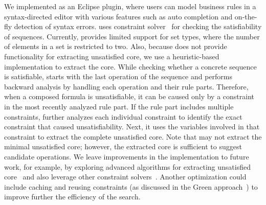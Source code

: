 We implemented \tool{} as an Eclipse plugin, where users can model business
rules in a syntax-directed editor with various features such as auto completion
and on-the-fly detection of syntax errors. \tool{} uses \choco{} constraint
solver~\cite{Choco} for checking the satisfiability of sequences.  Currently,
\tool{} provides limited support for set types, where the number of elements in
a set is restricted to two. Also, because \choco{} does not provide
functionality for extracting unsatisfied core, we use a heuristic-based
implementation to extract the core. While checking whether a concrete sequence
is satisfiable, \tool{} starts with the last operation of the sequence and
performs backward analysis by handling each operation and their rule
parts. Therefore, when a composed formula is unsatisfiable, it can be caused
only by a constraint in the most recently analyzed rule part. If the rule part
includes multiple constraints, \tool{} further analyzes each individual
constraint to identify the exact constraint that caused unsatisfiability. Next,
it uses the variables involved in that constraint to extract the complete
unsatisfied core. Note that \tool{} may not extract the minimal unsatisfied
core; however, the extracted core is sufficient to suggest candidate
operations. We leave improvements in the implementation to future work, for
example, by exploring advanced algorithms for extracting unsatisfied
core~\cite{Liffiton:2008:ACM} and also leverage other constraint
solvers~\cite{DeMoura:2008}. Another optimization could include caching and
reusing constraints (\eg as discussed in the Green approach~\cite{VisserGD12})
to improve further the efficiency of the search.


